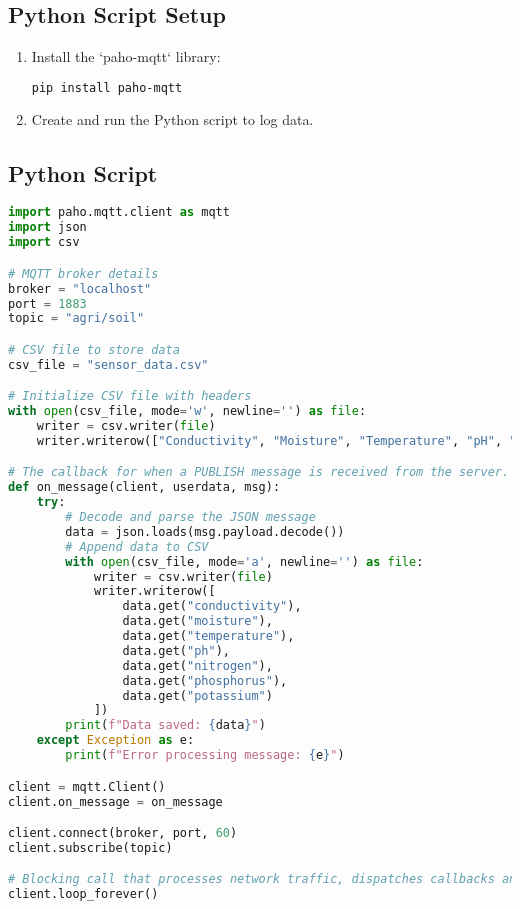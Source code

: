 \documentclass{article}
\begin{document}
\subsection{Python Script Setup}
\begin{enumerate}
    \item Install the `paho-mqtt` library:
    \begin{lstlisting}[language=bash]
    pip install paho-mqtt
    \end{lstlisting}
    \item Create and run the Python script to log data.
\end{enumerate}

\subsection{Python Script}
\begin{lstlisting}[language=Python]
import paho.mqtt.client as mqtt
import json
import csv

# MQTT broker details
broker = "localhost"
port = 1883
topic = "agri/soil"

# CSV file to store data
csv_file = "sensor_data.csv"

# Initialize CSV file with headers
with open(csv_file, mode='w', newline='') as file:
    writer = csv.writer(file)
    writer.writerow(["Conductivity", "Moisture", "Temperature", "pH", "Nitrogen", "Phosphorus", "Potassium"])

# The callback for when a PUBLISH message is received from the server.
def on_message(client, userdata, msg):
    try:
        # Decode and parse the JSON message
        data = json.loads(msg.payload.decode())
        # Append data to CSV
        with open(csv_file, mode='a', newline='') as file:
            writer = csv.writer(file)
            writer.writerow([
                data.get("conductivity"),
                data.get("moisture"),
                data.get("temperature"),
                data.get("ph"),
                data.get("nitrogen"),
                data.get("phosphorus"),
                data.get("potassium")
            ])
        print(f"Data saved: {data}")
    except Exception as e:
        print(f"Error processing message: {e}")

client = mqtt.Client()
client.on_message = on_message

client.connect(broker, port, 60)
client.subscribe(topic)

# Blocking call that processes network traffic, dispatches callbacks and handles reconnecting.
client.loop_forever()
\end{lstlisting}
\end{document}
